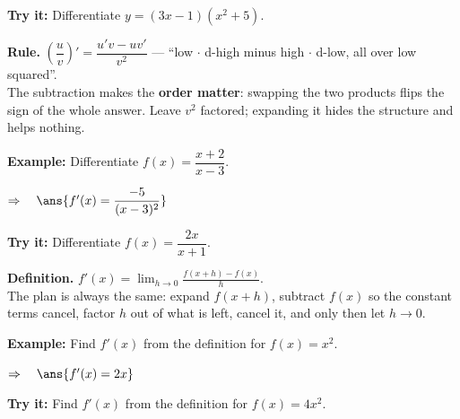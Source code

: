 \documentclass[12pt]{article}
\begin{document}
\begin{tryitbox}
\textbf{Try it:} \quad Differentiate $y = (3x - 1)(x^2 + 5)$.\\[2pt]
\end{tryitbox}


\begin{formulabox}
\textbf{Rule.} $\left(\dfrac{u}{v}\right)' = \dfrac{u'v - uv'}{v^2}$ ---
``low $\cdot$ d-high minus high $\cdot$ d-low, all over low squared''.\\[3pt]
The subtraction makes the \textbf{order matter}: swapping the two products
flips the sign of the whole answer. Leave $v^2$ factored; expanding it hides
the structure and helps nothing.
\end{formulabox}

\begin{examplebox}
\textbf{Example:} \quad Differentiate $f(x) = \dfrac{x + 2}{x - 3}$.

$\Rightarrow\quad \ans{f'(x) = \dfrac{-5}{(x - 3)^2}}$
\end{examplebox}

\begin{tryitbox}
\textbf{Try it:} \quad Differentiate $f(x) = \dfrac{2x}{x + 1}$.\\[2pt]
\end{tryitbox}


\begin{formulabox}
\textbf{Definition.} $f'(x) = \displaystyle\lim_{h \to 0}
\frac{f(x + h) - f(x)}{h}$.\\[3pt]
The plan is always the same: expand $f(x + h)$, subtract $f(x)$ so the
constant terms cancel, factor $h$ out of what is left, cancel it, and only
then let $h \to 0$.
\end{formulabox}

\begin{examplebox}
\textbf{Example:} \quad Find $f'(x)$ from the definition for $f(x) = x^2$.

$\Rightarrow\quad \ans{f'(x) = 2x}$
\end{examplebox}

\begin{tryitbox}
\textbf{Try it:} \quad Find $f'(x)$ from the definition for $f(x) = 4x^2$.\\[2pt]
\end{tryitbox}
\end{document}
